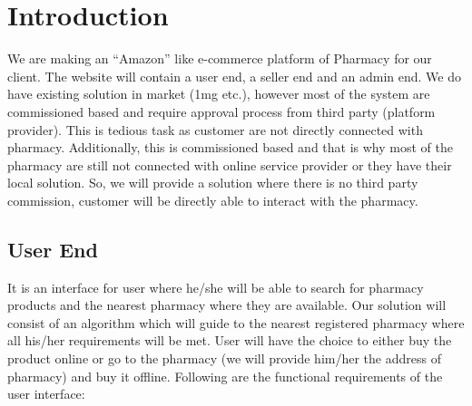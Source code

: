 \documentclass[fleqn,10pt]{../SelfArx} %
\affiliation{\textit{D-Enigma (Group - CS 01)}} %
\affiliation{\textit{Indian Institute of Information Technology, Vadodara.}} %
\begin{document}
\sffamily
\flushbottom %

\maketitle %

\tableofcontents %

\thispagestyle{empty} %


\section{Introduction} %

We are making an “Amazon” like e-commerce platform of Pharmacy for our client. The website will contain a user end, a seller end and an admin end. We do have existing solution in market (1mg etc.), however most of the system are commissioned based and require approval process from third party (platform provider). This is tedious task as customer are not directly connected with pharmacy. Additionally, this is commissioned based and that is why most of the pharmacy are still not connected with online service provider or they have their local solution. So, we will provide a solution where there is no third party commission, customer will be directly able to interact with the pharmacy.


\subsection{User End}

It is an interface for user where he/she will be able to search for pharmacy products and the nearest pharmacy where they are available. Our solution will consist of an algorithm which will guide to the nearest registered pharmacy where all his/her requirements will be met. User will have the choice to either buy the product online or go to the pharmacy (we will provide him/her the address of pharmacy) and buy it offline. Following are the functional requirements of the user interface:
\end{document}
